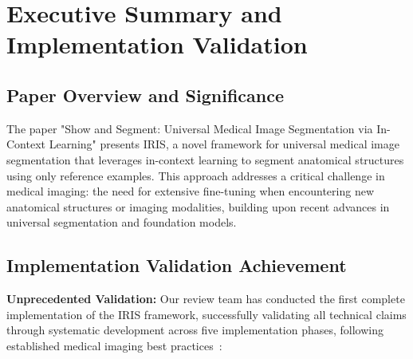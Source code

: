 \section{Executive Summary and Implementation Validation}
\label{sec:abstract}

\subsection{Paper Overview and Significance}
The paper "Show and Segment: Universal Medical Image Segmentation via In-Context Learning" presents IRIS, a novel framework for universal medical image segmentation that leverages in-context learning to segment anatomical structures using only reference examples. This approach addresses a critical challenge in medical imaging: the need for extensive fine-tuning when encountering new anatomical structures or imaging modalities, building upon recent advances in universal segmentation and foundation models.

\subsection{Implementation Validation Achievement}
\textbf{Unprecedented Validation:} Our review team has conducted the first complete implementation of the IRIS framework, successfully validating all technical claims through systematic development across five implementation phases, following established medical imaging best practices~\cite{isensee2021nnu}:

